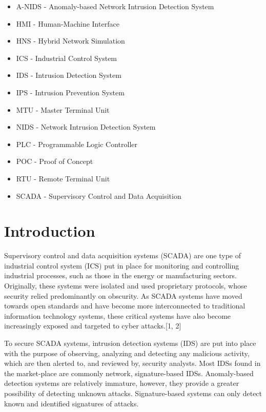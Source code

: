 \documentclass[11pt,]{article}
\begin{document}
\begin{itemize}
\itemsep1pt\parskip0pt
\item
  A-NIDS - Anomaly-based Network Intrusion Detection System
\item
  HMI - Human-Machine Interface
\item
  HNS - Hybrid Network Simulation
\item
  ICS - Industrial Control System
\item
  IDS - Intrusion Detection System
\item
  IPS - Intrusion Prevention System
\item
  MTU - Master Terminal Unit
\item
  NIDS - Network Intrusion Detection System
\item
  PLC - Programmable Logic Controller
\item
  POC - Proof of Concept
\item
  RTU - Remote Terminal Unit
\item
  SCADA - Supervisory Control and Data Acquisition
\end{itemize}

\newpage
\mbox{} \thispagestyle{empty}

\clearpage
{}

\setcounter{page}{17}

\section{Introduction}\label{introduction}

Supervisory control and data acquisition systems (SCADA) are one type of
industrial control system (ICS) put in place for monitoring and
controlling industrial processes, such as those in the energy or
manufacturing sectors. Originally, these systems were isolated and used
proprietary protocols, whose security relied predominantly on obscurity.
As SCADA systems have moved towards open standards and have become more
interconnected to traditional information technology systems, these
critical systems have also become increasingly exposed and targeted to
cyber attacks.{[}1, 2{]}

To secure SCADA systems, intrusion detection systems (IDS) are put into
place with the purpose of observing, analyzing and detecting any
malicious activity, which are then alerted to, and reviewed by, security
analysts. Most IDSs found in the market-place are commonly network,
signature-based IDSs. Anomaly-based detection systems are relatively
immature, however, they provide a greater possibility of detecting
unknown attacks. Signature-based systems can only detect known and
identified signatures of attacks.
\end{document}
